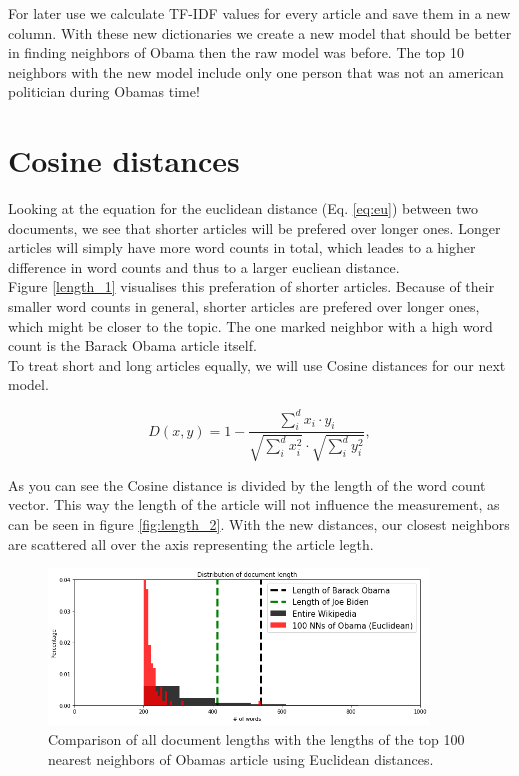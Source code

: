\documentclass[12pt]{scrreprt}
\begin{document}
For later use we calculate TF-IDF values for every article and save them in a new column. With these new dictionaries we create a new model that should be better in finding neighbors of Obama then the raw model was before. The top 10 neighbors with the new model include only one person that was not an american politician during Obamas time!\\

\section{Cosine distances}

Looking at the equation for the euclidean distance (Eq. \ref{eq:eu}) between two documents, we see that shorter articles will be prefered over longer ones. Longer articles will simply have more word counts in total, which leades to a higher difference in word counts and thus to a larger eucliean distance.\\

Figure \ref{length_1} visualises this preferation of shorter articles. Because of their smaller word counts in general, shorter articles are prefered over longer ones, which might be closer to the topic. The one marked neighbor with a high word count is the Barack Obama article itself.\\

To treat short and long articles equally, we will use Cosine distances for our next model.

\begin{center}
\begin{equation}
D(x,y)=1 - \frac{\sum_i^d x_i \cdot y_i }{\sqrt{\sum_i^d x_i^2 } \cdot \sqrt{\sum_i^d y_i^2 }}, 
\end{equation}
\end{center}
\noindent
As you can see the Cosine distance is divided by the length of the word count vector. This way the length of the article will not influence the measurement, as can be seen in figure \ref{fig:length_2}. With the new distances, our closest neighbors are scattered all over the axis representing the article legth.\\  

\begin{figure}[H]
  \begin{center}
    \caption{Comparison of all document lengths with the lengths of the top 100 nearest neighbors of Obamas article using Euclidean distances.}
    \label{fig:length_1}
    \includegraphics[width=0.9\textwidth, angle=0]{output_70_0.png}
  \end{center}
\end{figure}
\end{document}
